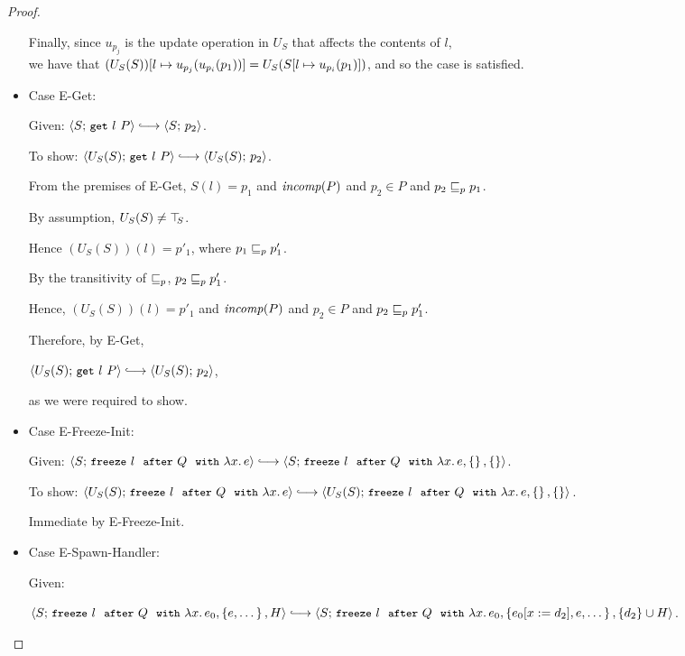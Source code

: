 \begin{proof}
\begin{itemize}
      Finally, since $u_{p_j}$ is the update operation in $U_S$ that
      affects the contents of $l$, \\ we have that
      $(U_S(S))[l \mapsto u_{p_j}(u_{p_i}(p_1))] =
      U_S(S[l \mapsto u_{p_i}(p_1)])$, and so the case is
      satisfied.

    \item Case {\sc E-Get}:

      Given: $\config{S}{\getexp{l}{P}} \parstepsto \config{S}{p_2}$.

      To show: $\config{U_S(S)}{\getexp{l}{P}} \parstepsto
      \config{U_S(S)}{p_2}$.

      From the premises of {\sc E-Get}, $S(l) = p_1$ and $\mathit{incomp}(P)$
      and $p_2 \in P$ and $p_2 \sqsubseteq_p p_1$.

      By assumption, $U_S(S) \neq \top\hspace{-0.85mm}_{S}$.

      Hence $(U_S(S))(l) = p'_1$, where $p_1 \sqsubseteq_p p'_1$.

      By the transitivity of $\sqsubseteq_p$, $p_2 \sqsubseteq_p p'_1$.

      Hence, $(U_S(S))(l) = p'_1$ and $\mathit{incomp}(P)$ and $p_2 \in P$ and
      $p_2 \sqsubseteq_p p'_1$.

      Therefore, by {\sc E-Get},

      $\config{U_S(S)}{\getexp{l}{P}} \parstepsto
      \config{U_S(S)}{p_2}$,

      as we were required to show.

    \item Case {\sc E-Freeze-Init}:

      Given: $\config{S}{\freezeafter{l}{Q}{\lam{x}{e}}} \parstepsto \\
      \config{S}{\freezeafterfull{l}{Q}{\lam{x}{e}}{\setof{}}{\setof{}}}$.

      To show: $\config{U_S(S)}{\freezeafter{l}{Q}{\lam{x}{e}}}
      \parstepsto \\
      \config{U_S(S)}{\freezeafterfull{l}{Q}{\lam{x}{e}}{\setof{}}{\setof{}}}$.

      Immediate by {\sc E-Freeze-Init}.

    \item Case {\sc E-Spawn-Handler}:

      Given:

      $\config{S}{\freezeafterfull{l}{Q}{\lam{x}{e_0}}{\setof{e,
            \dots}}{H}} \parstepsto \\
      \config{S}{\freezeafterfull{l}{Q}{\lam{x}{e_0}}{\setof{\subst{e_0}{x}{d_2},
            e, \dots}} {\{d_2\}\cup H}}$.


\end{itemize}
\end{proof}
